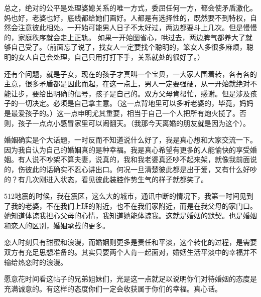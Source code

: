 \documentclass[punct=kaiming, zihao=5, openany, fontset=sikou]{ctexbook}
\begin{document}
总之，绝对的公平是处理婆媳关系的唯一方式，委屈任何一方，都会使矛盾激化。妈也好，老婆也好，底线都给她们画好。人都是有选择性的，既然要不到特权，自然会注意彼此相处。一开始可能男人日子不太好过，两边都要斗上几次。但是慢慢的，家庭秩序就会走上正轨。 如果一开始图省心，哄过去，两边脾气都养大了就够自己受了。（前面忘了说了，找女人一定要找个聪明的，笨女人多很多麻烦，聪明的女人自己会处理，自己只用打打下手，关系就处的很好了。） 

还有个问题，就是子女，现在的孩子才真叫一个宝贝，一大家人围着转，各有各的主意，很多矛盾都是因此而起，在这一点上，男人一定要强硬，从一开始就绝对不能让步，要给出明确的信号，孩子是自己的。双方父母肯帮忙，感谢。但是涉及孩子的一切决定。必须是自己拿主意。（这一点背地里可以多听老婆的，毕竟，妈妈是最爱孩子的。）这一点申明尤其重要，相当于自己一个人把所有炮火揽了。否则，孩子一点点小感冒家里可以闹翻天。（我那今天离婚的朋友就是因为这个）。

婚姻确实是个大话题，一时反而不知道说什么好了，我是真心想和大家交流一下。因为我自认为自己的婚姻真的是种幸福。我是真心希望有更多的人能愉快的享受婚姻。有人说不吵架不算夫妻，说真的，我和我老婆真还吵不起来架，就像我前面说的，伤彼此的话确实不忍心讲出口。何况一旦清楚彼此都是出于爱，又有什么好吵的？有几次刚进入状态，看见彼此装腔作势生气的样子就都笑了。 

512地震的时候，我在震区，这么大的城市，通讯中断的情况下，我第一时间见到了我的老婆，不在我们上班的附近，也不在我们家附近，而是在我父母的家门口。她知道体谅我担心父母的心情，我知道她能体谅我。这就是婚姻的默契。也是婚姻和恋人的区别，婚姻承载的更多。 

恋人时刻只有甜蜜和浪漫，而婚姻则更多是责任和平淡，这个转化的过程，是需要双方有充足思想准备的。其实只要两个人肯一起面对，婚姻生活平淡中的幸福并不输给热恋时的浪漫。

愿意花时间看这帖子的兄弟姐妹们，光是这一点就足以说明你们对待婚姻的态度是充满诚意的。有这样的态度你们一定会收获属于你们的幸福。真心话。
\end{document}
